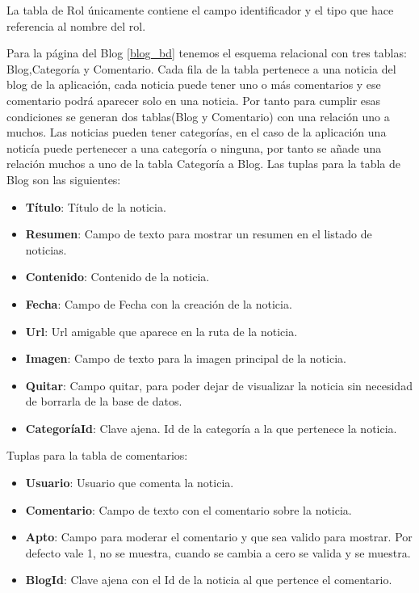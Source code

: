 \vspace{5 mm}

La tabla de Rol únicamente contiene el campo identificador y el tipo que hace referencia al nombre del rol.

\vspace{5 mm}

Para la página del Blog \ref{blog_bd} tenemos el esquema relacional con tres tablas: Blog,Categoría y Comentario. Cada fila de la tabla pertenece a una noticia del blog de la aplicación, cada noticia puede tener uno o más comentarios y ese comentario podrá aparecer solo en una noticia. Por tanto para cumplir esas condiciones se generan dos tablas(Blog y Comentario) con una relación uno a muchos. Las noticias pueden tener categorías, en el caso de la aplicación una noticía puede pertenecer a una categoría o ninguna, por tanto se añade una relación muchos a uno de la tabla Categoría a Blog. Las tuplas para la tabla de Blog son las siguientes:


\begin{itemize}

\item \textbf{Título}: Título de la noticia.
\item \textbf{Resumen}: Campo de texto para mostrar un resumen en el listado de noticias.
\item \textbf{Contenido}: Contenido de la noticia.
\item \textbf{Fecha}: Campo de Fecha con la creación de la noticia.
\item \textbf{Url}: Url amigable que aparece en la ruta de la noticia.
\item \textbf{Imagen}: Campo de texto para la imagen principal de la noticia.
\item \textbf{Quitar}: Campo quitar, para poder dejar de visualizar la noticia sin necesidad de borrarla de la base de datos.
\item \textbf{CategoríaId}: Clave ajena. Id de la categoría a la que pertenece la noticia.

\end{itemize}

\vspace{5 mm}

Tuplas para la tabla de comentarios:

\begin{itemize}

\item \textbf{Usuario}: Usuario que comenta la noticia.
\item \textbf{Comentario}: Campo de texto con el comentario sobre la noticia.
\item \textbf{Apto}: Campo para moderar el comentario y que sea valido para mostrar. Por defecto vale 1, no se muestra, cuando se cambia a cero se valida y se muestra.
\item \textbf{BlogId}: Clave ajena con el Id de la noticia al que pertence el comentario.


\end{itemize}

